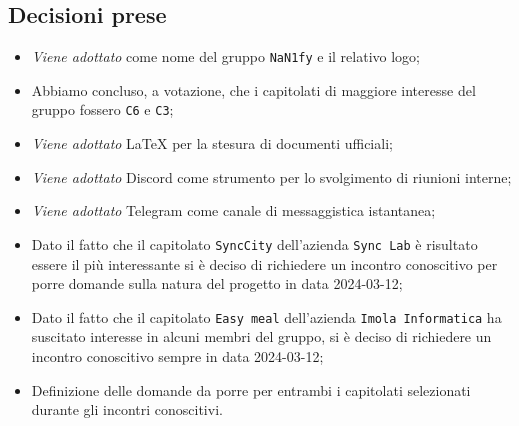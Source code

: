 \subsection{Decisioni prese}
\begin{itemize}
	\setlength\itemsep{0em}
	\item \textit{Viene adottato} come nome del gruppo \texttt{NaN1fy} e il relativo logo;
	\item Abbiamo concluso, a votazione, che i capitolati di maggiore interesse del gruppo fossero \texttt{C6} e \texttt{C3};
	\item \textit{Viene adottato} \LaTeX\: per la stesura di documenti ufficiali;
	\item \textit{Viene adottato} Discord come strumento per lo svolgimento di riunioni interne;
	\item \textit{Viene adottato} Telegram come canale di messaggistica istantanea;
	\item Dato il fatto che il capitolato \texttt{SyncCity} dell’azienda \texttt{Sync Lab} è risultato essere il più interessante si è deciso di richiedere un incontro conoscitivo per porre domande sulla natura del progetto in data 2024-03-12;
	\item Dato il fatto che il capitolato \texttt{Easy meal} dell’azienda \texttt{Imola Informatica} ha suscitato interesse in alcuni membri del gruppo, si è deciso di richiedere un incontro conoscitivo sempre in data 2024-03-12;
	\item Definizione delle domande da porre per entrambi i capitolati selezionati durante gli incontri conoscitivi.
\end{itemize}



